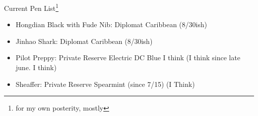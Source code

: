 \documentclass[12pt]{article}
\renewcommand{\,}{\textsuperscript{,}}
\begin{document}
Current Pen List\footnote{for my own posterity, mostly}

\begin{itemize}  
\item Hongdian Black with Fude Nib: Diplomat Caribbean (8/30ish)  
\item Jinhao Shark: Diplomat Caribbean (8/30ish)  
\item Pilot Preppy: Private Reserve Electric DC Blue I think (I think since late june. I think)  
\item Sheaffer: Private Reserve Spearmint (since 7/15) (I Think)
\end{itemize}
\end{document}
